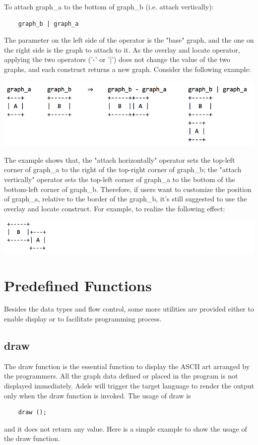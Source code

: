 \documentclass[11pt,letterpaper]{article}
\begin{document}
To attach graph\_a to the bottom of graph\_b (i.e. attach vertically):
\begin{lstlisting}
    graph_b | graph_a
\end{lstlisting}

The parameter on the left side of the operator is the "base" graph, and the one on the right side is the graph to attach to it. As the overlay and locate operator, applying the two operators ('-' or '|') does not change the value of the two graphs, and each construct returns a new graph. Consider the following example:

\includegraphics[width=\textwidth]{./graph_02.png}

The example shows that, the "attach horizontally" operator sets the top-left corner of graph\_a to the right of the top-right corner of graph\_b; the "attach vertically" operator sets the top-left corner of graph\_a to the bottom of the bottom-left corner of graph\_b. Therefore, if users want to customize the position of graph\_a, relative to the border of the graph\_b, it's still suggested to use the overlay and locate construct. For example, to realize the following effect:

\includegraphics[width=\textwidth]{./graph_03.png}

\section {Predefined Functions}

Besides the data types and flow control, some more utilities are provided either to enable display or to facilitate programming process.

\subsection {draw}
The draw function is the essential function to display the ASCII art arranged by the programmers. All the graph data defined or placed in the program is not displayed immediately. Adele will trigger the target language to render the output only when the draw function is invoked. The usage of draw is
\begin{lstlisting}
	draw ();
\end{lstlisting}
and it does not return any value. Here is a simple example to show the usage of the draw function.
\end{document}
